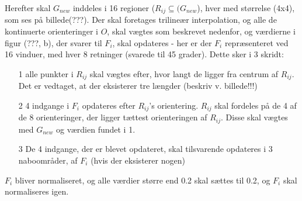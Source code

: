 Herefter skal $G_{new}$ inddeles i 16 regioner ($R_{ij} \subseteq (G_{new}$), hver med størrelse (4x4), som ses på billede(???). Der skal foretages trilineær interpolation, og alle de kontinuerte orienteringer i $O$, skal vægtes som beskrevet nedenfor, og værdierne i figur (???, b), der svarer til $F_i$, skal opdateres - her er der $F_i$ repræsenteret ved 16 vinduer, med hver 8 retninger (svarede til 45 grader). Dette sker i 3 skridt:
\begin{itemize}
\item[1] alle punkter i $R_{ij}$ skal vægtes efter, hvor langt de ligger fra centrum af $R_{ij}$. Det er vedtaget, at der eksisterer tre længder (beskriv v. billede!!!)
\item[2] 4 indgange i $F_i$ opdateres efter $R_{ij}$'s orientering. $R_{ij}$ skal fordeles på de 4 af de 8 orienteringer, der ligger tættest orienteringen af $R_{ij}$. Disse skal vægtes med $G_{new}$ og værdien fundet i 1. 
\item[3] De 4 indgange, der er blevet opdateret, skal tilsvarende opdateres i 3 naboområder, af $F_i$ (hvis der eksisterer nogen)
\end{itemize}

$F_i$ bliver normaliseret, og alle værdier større end 0.2 skal sættes til 0.2, og $F_i$ skal normaliseres igen.